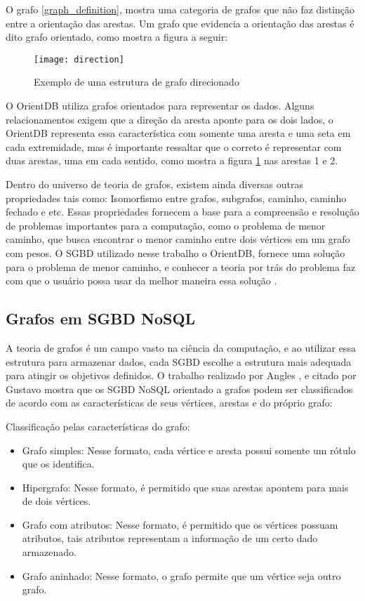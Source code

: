 	O grafo \ref{graph_definition}, mostra uma categoria de grafos que não faz distinção entre a orientação das arestas. Um grafo que evidencia a orientação das arestas é dito grafo orientado, como mostra a figura a seguir:
	
\begin{figure}[H]
	\centering
    \texttt{[image: direction]}
    \caption{Exemplo de uma estrutura de grafo direcionado}
    \label{graph_direction}
\end{figure}

	O OrientDB utiliza grafos orientados para representar os dados. Alguns relacionamentos exigem que a direção da aresta aponte para os dois lados, o OrientDB representa essa característica com somente uma aresta e uma seta em cada extremidade, mas é importante ressaltar que o correto é representar com duas arestas, uma em cada sentido, como mostra a figura \ref{graph_direction} nas arestas 1 e 2.
	
	Dentro do universo de teoria de grafos, existem ainda diversas outras propriedades tais como: Isomorfismo entre grafos, subgrafos, caminho, caminho fechado e etc. Essas propriedades fornecem a base para a compreensão e resolução de problemas importantes para a computação, como o problema de menor caminho, que busca encontrar o menor caminho entre dois vértices em um grafo com pesos. O SGBD utilizado nesse trabalho o OrientDB, fornece uma solução para o problema de menor caminho, e conhecer a teoria por trás do problema faz com que o usuário possa usar da melhor maneira essa solução \cite{orientShortestPath}.
	
\subsection{Grafos em SGBD NoSQL}
	A teoria de grafos é um campo vasto na ciência da computação, e ao utilizar essa estrutura para armazenar dados, cada SGBD escolhe a estrutura mais adequada para atingir os objetivos definidos. O trabalho realizado por Angles \cite{angles2012comparison}, e citado por Gustavo \cite{mdgnosql} mostra que os SGBD NoSQL orientado a grafos podem ser classificados de acordo com as características de seus vértices, arestas e do próprio grafo: 
	
	Classificação pelas características do grafo:
\begin{itemize}
		\item Grafo simples: Nesse formato, cada vértice e aresta possui somente um rótulo que os identifica.
		\item Hipergrafo: Nesse formato, é permitido que suas arestas apontem para mais de dois vértices.
		\item Grafo com atributos: Nesse formato, é permitido que os vértices possuam atributos, tais atributos representam a informação de um certo dado armazenado.
		\item Grafo aninhado: Nesse formato, o grafo permite que um vértice seja outro grafo.
\end{itemize}

